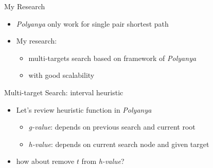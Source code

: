 \begin{frame}{My Research}
\begin{itemize}
    \item \small {\textit{Polyanya} only work for single pair shortest path}
    \item My research:
        \begin{itemize}
            \item \small{multi-targets search based on framework of \textit{Polyanya}}
            \item \small{with good scalability}
        \end{itemize}
\end{itemize}
\end{frame}

\begin{frame}{Multi-target Search: interval heuristic}
\begin{minipage}{.6\textwidth}
\begin{itemize}
\item \small {Let's review heuristic function in \textit{Polyanya}}
    \begin{itemize}
        \item \small{
            \textit{g-value}: depends on previous search and current root
        }
        \item \small{
            \textit{h-value}: depends on current search node and given target
        }
    \end{itemize}
\item \small how about remove $t$ from \textit{h-value}?
\end{itemize}
\end{minipage}%
\begin{minipage}{.4\textwidth}
    \begin{adjustbox}{max totalsize={.9\textwidth}{.9\textheight}, right}
    \end{adjustbox}
\end{minipage}
\end{frame}

